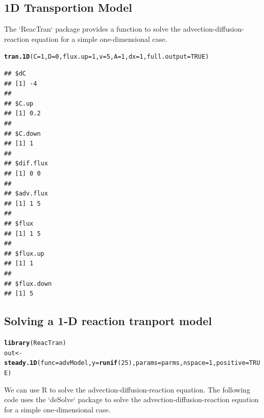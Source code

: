 \documentclass{tufte-handout}\usepackage[]{graphicx}\usepackage[]{xcolor}
\makeatletter
\newcommand{\hlnum}[1]{\textcolor[rgb]{0.686,0.059,0.569}{#1}}%
\newcommand{\hlstd}[1]{\textcolor[rgb]{0.345,0.345,0.345}{#1}}%
\newcommand{\hlkwb}[1]{\textcolor[rgb]{0.69,0.353,0.396}{#1}}%
\newcommand{\hlkwc}[1]{\textcolor[rgb]{0.333,0.667,0.333}{#1}}%
\newcommand{\hlkwd}[1]{\textcolor[rgb]{0.737,0.353,0.396}{\textbf{#1}}}%
\newenvironment{kframe}{%
 \def\at@end@of@kframe{}%
 \ifinner\ifhmode%
  \def\at@end@of@kframe{\end{minipage}}%
  \begin{minipage}{\columnwidth}%
 \fi\fi%
 \def\FrameCommand##1{\hskip\@totalleftmargin \hskip-\fboxsep
 \colorbox{shadecolor}{##1}\hskip-\fboxsep
     \hskip-\linewidth \hskip-\@totalleftmargin \hskip\columnwidth}%
 \MakeFramed {\advance\hsize-\width
   \@totalleftmargin\z@ \linewidth\hsize
   \@setminipage}}%
 {\par\unskip\endMakeFramed%
 \at@end@of@kframe}
\newenvironment{knitrout}{}{} %
\makeatother
\begin{document}
\subsection{1D Transportion Model}

The `ReacTran` package provides a function to solve the advection-diffusion-reaction equation for a simple one-dimensional case.

\begin{knitrout}
\color{fgcolor}\begin{kframe}
\begin{alltt}
\hlkwd{tran.1D}\hlstd{(}\hlkwc{C} \hlstd{=} \hlnum{1}\hlstd{,} \hlkwc{D} \hlstd{=} \hlnum{0}\hlstd{,} \hlkwc{flux.up} \hlstd{=} \hlnum{1}\hlstd{,} \hlkwc{v} \hlstd{=} \hlnum{5}\hlstd{,} \hlkwc{A}\hlstd{=} \hlnum{1}\hlstd{,} \hlkwc{dx} \hlstd{=} \hlnum{1}\hlstd{,} \hlkwc{full.output} \hlstd{=} \hlnum{TRUE}\hlstd{)}
\end{alltt}
\begin{verbatim}
## $dC
## [1] -4
## 
## $C.up
## [1] 0.2
## 
## $C.down
## [1] 1
## 
## $dif.flux
## [1] 0 0
## 
## $adv.flux
## [1] 1 5
## 
## $flux
## [1] 1 5
## 
## $flux.up
## [1] 1
## 
## $flux.down
## [1] 5
\end{verbatim}
\end{kframe}
\end{knitrout}


\subsection{Solving a 1-D reaction tranport model}

\begin{knitrout}
\color{fgcolor}\begin{kframe}
\begin{alltt}
\hlkwd{library}\hlstd{(ReacTran)}
\hlstd{out} \hlkwb{<-} \hlkwd{steady.1D}\hlstd{(}\hlkwc{func} \hlstd{= advModel,} \hlkwc{y} \hlstd{=} \hlkwd{runif}\hlstd{(}\hlnum{25}\hlstd{),} \hlkwc{params} \hlstd{= parms,} \hlkwc{nspace}\hlstd{=} \hlnum{1}\hlstd{,} \hlkwc{positive} \hlstd{=} \hlnum{TRUE}\hlstd{)}
\end{alltt}
\end{kframe}
\end{knitrout}

We can use R to solve the advection-diffusion-reaction equation. The following code uses the `deSolve` package to solve the advection-diffusion-reaction equation for a simple one-dimensional case.
\end{document}
